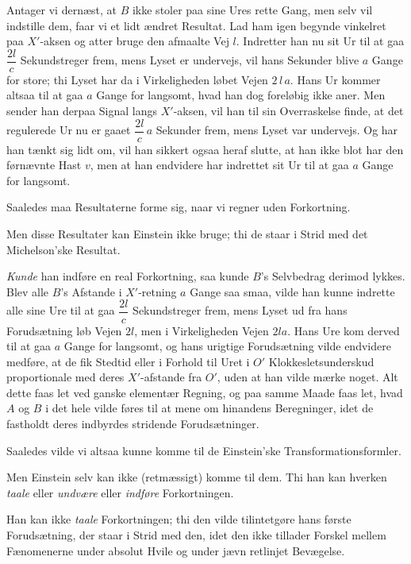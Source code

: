 \documentclass[12pt,a4paper]{article}
\newcommand{\opage}[1]{\marginnote{\footnotesize\textit{[#1]}}}
\begin{document}
Antager vi dernæst, at $B$ ikke stoler paa sine Ures rette Gang, men selv vil
indstille dem, faar vi et lidt ændret Resultat. Lad ham igen begynde vinkelret
paa $X'$-aksen og atter bruge den afmaalte Vej $l$. Indretter han nu sit Ur til
at gaa $\dfrac{2l}{c}$ Sekundstreger frem, mens Lyset er undervejs, vil hans
Sekunder blive $a$ Gange for store; thi Lyset har da i Virkeligheden løbet
Vejen $2\,l\,a$. Hans Ur kommer altsaa til at gaa $a$ Gange for langsomt, hvad
han dog foreløbig ikke aner. Men sender han derpaa Signal langs $X'$-aksen, vil
han til sin Overraskelse finde, at det regulerede Ur nu er gaaet
$\dfrac{2l}{c}\,a$ \guillemotright Sekunder\guillemotleft{} frem, mens Lyset
var undervejs. Og har han tænkt sig lidt om, vil han sikkert ogsaa heraf
slutte, at han ikke blot har den førnævnte Hast $v$, men at han endvidere har
indrettet sit Ur til at gaa $a$ Gange for langsomt.

Saaledes maa Resultaterne forme sig, naar vi regner uden Forkortning.

\opage{201} Men disse Resultater kan Einstein ikke bruge; thi de staar i Strid med det
Michelson'ske Resultat.

\emph{Kunde} han indføre en real Forkortning, saa kunde $B$'s Selvbedrag
derimod lykkes. Blev alle $B$'s Afstande i $X'$-retning $a$ Gange saa smaa,
vilde han kunne indrette alle sine Ure til at gaa $\dfrac{2l}{c}$
Sekundstreger frem, mens Lyset ud fra hans Forudsætning løb Vejen $2l$, men i
Virkeligheden Vejen $2la$. Hans Ure kom derved til at gaa $a$ Gange for
langsomt, og hans urigtige Forudsætning vilde endvidere medføre, at de fik
Stedtid eller i Forhold til Uret i $O'$ Klokkesletsunderskud proportionale med
deres $X'$-afstande fra $O'$, uden at han vilde mærke noget. Alt dette faas let
ved ganske elementær Regning, og paa samme Maade faas let, hvad $A$ og $B$ i
det hele vilde føres til at mene om hinandens Beregninger, idet de fastholdt
deres indbyrdes stridende Forudsætninger.

Saaledes vilde vi altsaa kunne komme til \guillemotright de Einstein'ske
Transformationsformler\guillemotleft.

Men Einstein selv kan ikke (retmæssigt) komme til dem. Thi han kan hverken
\emph{taale} eller \emph{undvære} eller \emph{indføre} Forkortningen.

Han kan ikke \emph{taale} Forkortningen; thi den vilde tilintetgøre hans
første Forudsætning, der staar i Strid med den, idet den ikke tillader Forskel
mellem Fænomenerne under absolut Hvile og under jævn retlinjet Bevægelse.
\end{document}

